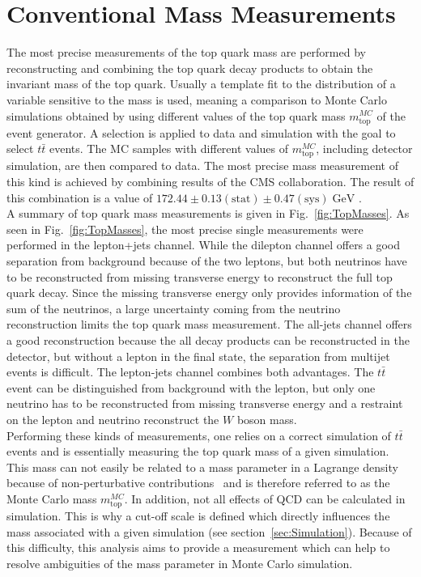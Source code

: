 \section{Conventional Mass Measurements}
	The most precise measurements of the top quark mass are performed by reconstructing and combining the top quark decay products to obtain the invariant mass of the top quark. Usually a template fit to the distribution of a variable sensitive to the mass is used, meaning a comparison to Monte Carlo simulations obtained by using different values of the top quark mass $m_\text{top}^{MC}$ of the event generator. A selection is applied to data and simulation with the goal to select $t\bar{t}$ events. The MC samples with different values of $m_\text{top}^{MC}$, including detector simulation, are then compared to data. The most precise mass measurement of this kind is achieved by combining results of the CMS collaboration. The result of this combination is a value of $172.44 \pm 0.13 (\text{stat}) \pm 0.47 (\text{sys})\;\text{GeV}$ \cite{topmass_combination}. \\
	A summary of top quark mass measurements is given in Fig.~\ref{fig:TopMasses}. As seen in Fig.~\ref{fig:TopMasses}, the most precise single measurements were performed in the lepton+jets channel. While the dilepton channel offers a good separation from background because of the two leptons, but both neutrinos have to be reconstructed from missing transverse energy to reconstruct the full top quark decay. Since the missing transverse energy only provides information of the sum of the neutrinos, a large uncertainty coming from the neutrino reconstruction limits the top quark mass measurement. The all-jets channel offers a good reconstruction because the all decay products can be reconstructed in the detector, but without a lepton in the final state, the separation from multijet events is difficult. The lepton-jets channel combines both advantages. The $t\bar{t}$ event can be distinguished from background with the lepton, but only one neutrino has to be reconstructed from missing transverse energy and a restraint on the lepton and neutrino reconstruct the $W$ boson mass.\\
	Performing these kinds of measurements, one relies on a correct simulation of $t\bar{t}$ events and is essentially measuring the top quark mass of a given simulation. This mass can not easily be related to a mass parameter in a Lagrange density because of non-perturbative contributions~\cite{tevjetmass} and is therefore referred to as the Monte Carlo mass $m_\text{top}^{MC}$. In addition, not all effects of QCD can be calculated \cite{nonperturbative} in simulation. This is why a cut-off scale \cite{cutoff} is defined which directly influences the mass associated with a given simulation (see section~\ref{sec:Simulation}). Because of this difficulty, this analysis aims to provide a measurement which can help to resolve ambiguities of the mass parameter in Monte Carlo simulation.
